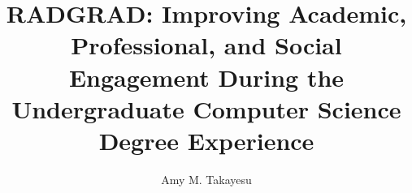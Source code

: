 \documentclass[11pt, thesis, actual]{uhthesis}
\title{RADGRAD: Improving Academic, Professional, and Social Engagement During the Undergraduate Computer Science Degree Experience}
\author{Amy M. Takayesu}
\begin{document}
\maketitle
\begin{frontmatter}


\copyrightpage



 

\tableofcontents



\end{frontmatter}










\appendix






\end{document}
